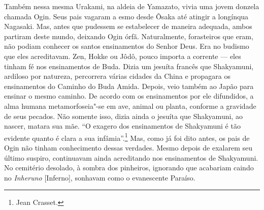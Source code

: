 Também nessa mesma Urakami, na aldeia de Yamazato, vivia uma jovem
donzela chamada Ogin. Seus pais  vagaram a esmo desde Ôsaka até atingir
a longínqua Nagasaki. Mas, antes que pudessem se estabelecer de maneira
adequada, ambos partiram deste mundo, deixando Ogin órfã. Naturalmente,
forasteiros que eram, não podiam conhecer os santos ensinamentos do
Senhor Deus. Era no budismo que eles acreditavam. Zen, Hokke ou Jôdô,
pouco importa a corrente --- eles tinham fé nos ensinamentos de Buda.
Dizia um jesuíta francês que Shakyamuni, 
ardiloso por natureza, percorrera várias cidades da China e propagara
os ensinamentos do Caminho do Buda Amida. Depois, veio também ao Japão
para ensinar o mesmo caminho. De acordo com os ensinamentos por ele
difundidos, a alma humana metamorfoseia"-se em ave, animal ou planta,
conforme a gravidade de seus pecados. Não somente isso, dizia ainda o
jesuíta que Shakyamuni, ao nascer, matara sua mãe. ``O exagero dos ensinamentos 
de Shakyamuni é tão evidente quanto é clara a sua infâmia''.\footnote{Jean Crasset.} 
Mas, como já foi dito antes, os pais de Ogin não tinham conhecimento dessas
verdades. Mesmo depois de exalarem seu último suspiro, continuavam
ainda acreditando nos ensinamentos de Shakyamuni. No cemitério
desolado, à sombra dos pinheiros, ignorando que acabariam caindo no
\textit{Inheruno} [Inferno], sonhavam como o evanescente Paraíso.

